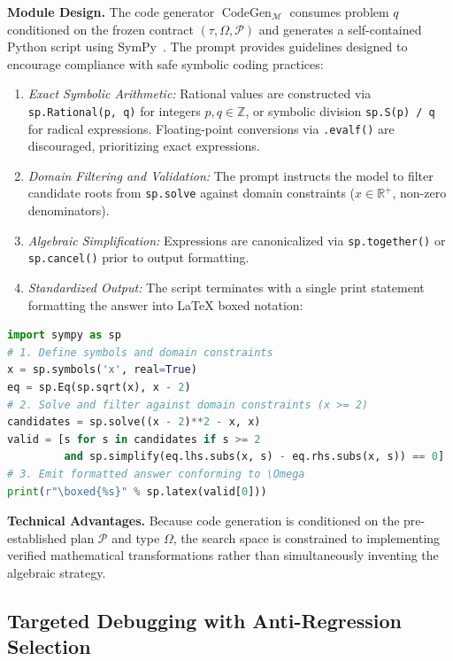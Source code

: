 \documentclass[runningheads]{llncs}
\begin{document}
\textbf{Module Design.} The code generator $\operatorname{CodeGen}_{\mathcal{M}}$ consumes problem $q$ conditioned on the frozen contract $(\tau, \Omega, \mathcal{P})$ and generates a self-contained Python script using SymPy~\cite{meurer2017sympy}. The prompt provides guidelines designed to encourage compliance with safe symbolic coding practices:
\begin{enumerate}
    \item \textit{Exact Symbolic Arithmetic:} Rational values are constructed via \texttt{sp.Rational(p, q)} for integers $p, q \in \mathbb{Z}$, or symbolic division \texttt{sp.S(p) / q} for radical expressions. Floating-point conversions via \texttt{.evalf()} are discouraged, prioritizing exact expressions.
    \item \textit{Domain Filtering and Validation:} The prompt instructs the model to filter candidate roots from \texttt{sp.solve} against domain constraints ($x \in \mathbb{R}^+$, non-zero denominators).
    \item \textit{Algebraic Simplification:} Expressions are canonicalized via \texttt{sp.together()} or \texttt{sp.cancel()} prior to output formatting.
    \item \textit{Standardized Output:} The script terminates with a single print statement formatting the answer into \LaTeX{} boxed notation:
\end{enumerate}
\begin{lstlisting}[style=promptstyle,language=Python]
import sympy as sp
# 1. Define symbols and domain constraints
x = sp.symbols('x', real=True)
eq = sp.Eq(sp.sqrt(x), x - 2)
# 2. Solve and filter against domain constraints (x >= 2)
candidates = sp.solve((x - 2)**2 - x, x)
valid = [s for s in candidates if s >= 2 
         and sp.simplify(eq.lhs.subs(x, s) - eq.rhs.subs(x, s)) == 0]
# 3. Emit formatted answer conforming to \Omega
print(r"\boxed{%s}" % sp.latex(valid[0]))
\end{lstlisting}

\textbf{Technical Advantages.} Because code generation is conditioned on the pre-established plan $\mathcal{P}$ and type $\Omega$, the search space is constrained to implementing verified mathematical transformations rather than simultaneously inventing the algebraic strategy.

\subsection{Targeted Debugging with Anti-Regression Selection}
\label{sec:debugging}
\end{document}
